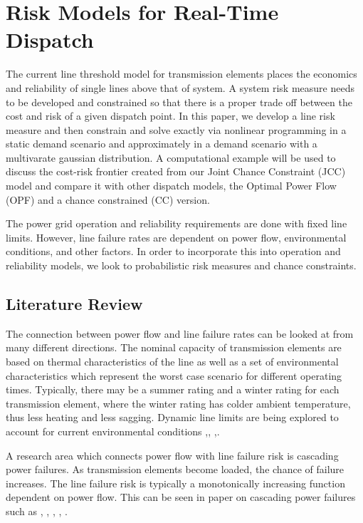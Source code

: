 \newcommand{\mypathjcc}{../thesis/jcc}
\newcommand{\mypathjccdata}{../thesis/jcc/data}

\chapter{Risk Models for Real-Time Dispatch}
The current line threshold model for transmission elements places the economics and reliability of single lines above that of system.  A system risk measure needs to be developed and constrained so that there is a proper trade off between the cost and risk of a given dispatch point.  In this paper, we develop a line risk measure and then constrain and solve exactly via nonlinear programming in a static demand scenario and approximately in a demand scenario with a multivarate gaussian distribution.  A computational example will be used to discuss the cost-risk frontier created from our Joint Chance Constraint (JCC) model and compare it with other dispatch models, the Optimal Power Flow (OPF) and a chance constrained (CC) version.  

The power grid operation and reliability requirements are done with fixed line limits.  However, line failure rates are dependent on power flow, environmental conditions, and other factors.  In order to incorporate this into operation and reliability models, we look to probabilistic risk measures and chance constraints. 


\section{Literature Review}
The connection between power flow and line failure rates can be looked at from many different directions.  The nominal capacity of transmission elements are based on thermal characteristics of the line as well as a set of environmental characteristics which represent the worst case scenario for different operating times.  Typically, there may be a summer rating and a winter rating for each transmission element, where the winter rating has colder ambient temperature, thus less heating and less sagging.  Dynamic line limits are being explored to account for current environmental conditions \cite{bucher_2013},\cite{yip_2009}, \cite{wang_2011},\cite{zhang_2002}.

A research area which connects power flow with line failure risk is cascading power failures.  As transmission elements become loaded, the chance of failure increases. The line failure risk is typically a monotonically increasing function dependent on power flow.  This can be seen in paper on cascading power failures such as \cite{carreras_2002}, \cite{chen_2005}, \cite{dobson_2007}, \cite{newman_2011}, \cite{hines_2011}.

